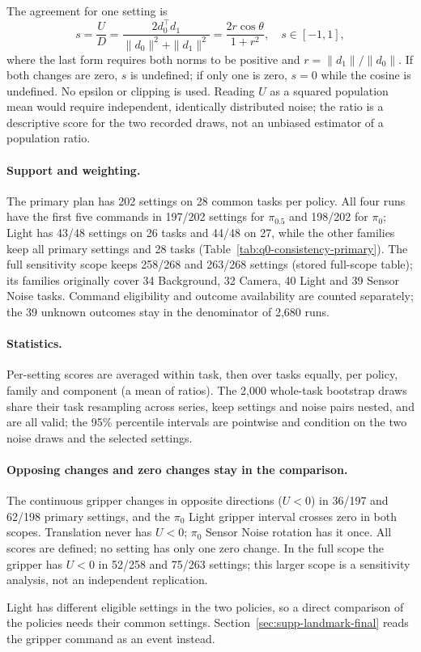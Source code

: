 The agreement for one setting is
\begin{equation}
s=\frac{U}{D}
=\frac{2d_0^\top d_1}{\|d_0\|^2+\|d_1\|^2}
=\frac{2r\cos\theta}{1+r^2},\quad s\in[-1,1],
\label{eq:q0-consistency}
\end{equation}
where the last form requires both norms to be positive and $r=\|d_1\|/\|d_0\|$. If both changes are zero, $s$ is undefined; if only one is zero, $s=0$ while the cosine is undefined. No epsilon or clipping is used. Reading $U$ as a squared population mean would require independent, identically distributed noise; the ratio is a descriptive score for the two recorded draws, not an unbiased estimator of a population ratio.

\paragraph{Support and weighting.}
The primary plan has 202 settings on 28 common tasks per policy. All four runs have the first five commands in 197/202 settings for $\pi_{0.5}$ and 198/202 for $\pi_0$; Light has 43/48 settings on 26 tasks and 44/48 on 27, while the other families keep all primary settings and 28 tasks (Table~\ref{tab:q0-consistency-primary}). The full sensitivity scope keeps 258/268 and 263/268 settings (stored full-scope table); its families originally cover 34 Background, 32 Camera, 40 Light and 39 Sensor Noise tasks. Command eligibility and outcome availability are counted separately; the 39 unknown outcomes stay in the denominator of 2,680 runs.

\paragraph{Statistics.}
Per-setting scores are averaged within task, then over tasks equally, per policy, family and component (a mean of ratios). The 2,000 whole-task bootstrap draws share their task resampling across series, keep settings and noise pairs nested, and are all valid; the 95\% percentile intervals are pointwise and condition on the two noise draws and the selected settings.



\paragraph{Opposing changes and zero changes stay in the comparison.}
The continuous gripper changes in opposite directions ($U<0$) in 36/197 and 62/198 primary settings, and the $\pi_0$ Light gripper interval crosses zero in both scopes. Translation never has $U<0$; $\pi_0$ Sensor Noise rotation has it once. All scores are defined; no setting has only one zero change. In the full scope the gripper has $U<0$ in 52/258 and 75/263 settings; this larger scope is a sensitivity analysis, not an independent replication.

Light has different eligible settings in the two policies, so a direct comparison of the policies needs their common settings. Section~\ref{sec:supp-landmark-final} reads the gripper command as an event instead.


